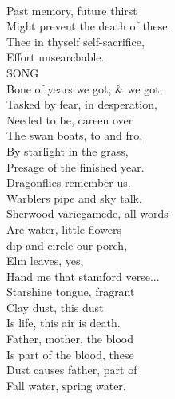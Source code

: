 \documentclass[smalldemyvopaper,11pt,twoside,onecolumn,openright,extrafontsizes]{memoir}
\begin{document}
\\Past memory, future thirst
\\Might prevent the death of these
\\Thee in thyself self-sacrifice,
\\Effort unsearchable.
\\SONG
\\Bone of years we got, \& we got,
\\Tasked by fear, in desperation,
\\Needed to be, careen over
\\The swan boats, to and fro,
\\By starlight in the grass,
\\Presage of the finished year.
\\Dragonflies remember us.
\\Warblers pipe and sky talk.
\\Sherwood variegamede, all words
\\Are water, little flowers
\\dip and circle our porch,
\\Elm leaves, yes,
\\Hand me that stamford verse...
\\Starshine tongue, fragrant
\\Clay dust, this dust
\\Is life, this air is death.
\\Father, mother, the blood
\\Is part of the blood, these
\\Dust causes father, part of
\\Fall water, spring water.
\end{document}
